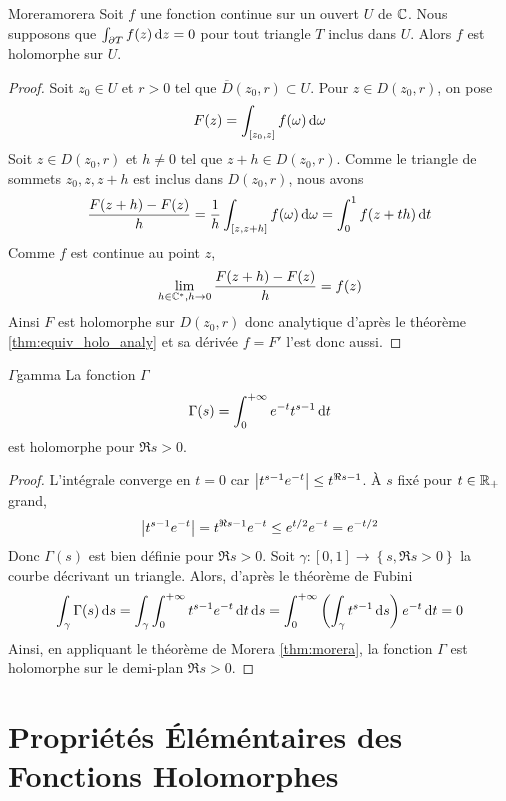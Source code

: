 \documentclass{cours}
\begin{document}
\begin{théorème}{Morera}{morera}
    Soit $f$ une fonction continue sur un ouvert $U$ de $\mathbb{C}$. Nous supposons que $\int_{\partial T}f(z) {\rm \, d} z = 0$ pour tout triangle $T$ inclus dans $U$. Alors $f$ est holomorphe sur $U$.
\end{théorème}
\begin{proof}
    Soit $z_{0} \in U$ et $r > 0$ tel que $\overline{D}(z_{0}, r) \subset U$. Pour $z \in D(z_{0}, r)$, on pose 
    \[
        F(z) = \int_{[z_{0}, z]} f(\omega) {\rm \, d} \omega
    \]
    Soit $z \in D(z_{0}, r)$ et $h \neq 0$ tel que $z + h \in D(z_{0}, r)$. Comme le triangle de sommets $z_{0}, z, z + h$ est inclus dans $D(z_{0}, r)$, nous avons 
    \[
        \frac{F(z + h)-F(z)}{h} = \frac{1}{h}\int_{[z, z + h]}f(\omega){\rm \, d} \omega = \int_{0}^{1} f(z + th){\rm \, d} t
    \]
    Comme $f$ est continue au point $z$, 
    \[
        \lim_{h \in \mathbb{C}^{*}, h \to 0} \frac{F(z + h) - F(z)}{h} = f(z)
    \]
    Ainsi $F$ est holomorphe sur $D(z_{0}, r)$ donc analytique d'après le théorème \ref{thm:equiv_holo_analy} et sa dérivée $f = F'$ l'est donc aussi.
\end{proof}
\begin{corollaire}{$\Gamma$}{gamma}
    La fonction $\Gamma$
    \[
        \Gamma(s) = \int_{0}^{+\infty}e^{-t}t^{s - 1}{\rm \, d} t
    \]
    est holomorphe pour $\Re s > 0$.
\end{corollaire}
\begin{proof}
    L'intégrale converge en $t = 0$ car $\left|t^{s - 1}e^{-t}\right| \leq t^{\Re s  - 1}$. À $s$ fixé pour $t \in \mathbb{R}_{+}$ grand, 
    \[
        \left|t^{s - 1}e^{-t}\right| = t^{\Re s - 1}e^{-t}\leq e^{t/2}e^{-t} = e^{-t/2}
    \]
    Donc $\Gamma(s)$ est bien définie pour $\Re s > 0$. Soit $\gamma : [0, 1] \to \left\{s, \Re s > 0\right\}$ la courbe décrivant un triangle. Alors, d'après le théorème de Fubini 
    \[
        \int_{\gamma}\Gamma(s) {\rm \, d} s = \int_{\gamma}\int_{0}^{+\infty}t^{s - 1}e^{-t}{\rm \, d} t{\rm \, d} s = \int_{0}^{+ \infty}\left(\int_{\gamma}t^{s-1}{\rm \, d} s\right)e^{-t}{\rm \, d} t = 0
    \]
    Ainsi, en appliquant le théorème de Morera \ref{thm:morera}, la fonction $\Gamma$ est holomorphe sur le demi-plan $\Re s > 0$.
\end{proof}


\section{Propriétés Éléméntaires des Fonctions Holomorphes}
\end{document}

